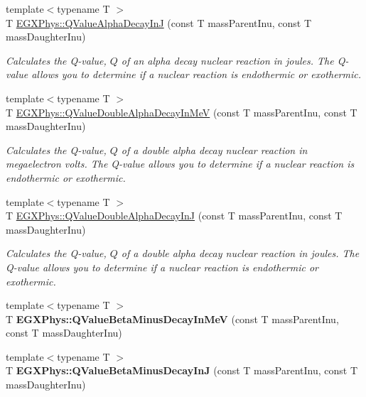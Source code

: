 \begin{DoxyCompactItemize}
{\footnotesize template$<$typename T $>$ }\\T \mbox{\hyperlink{_q_value_8hpp_ab8a50c18f6de3c1b6ed280c26c3ff3a5}{E\+G\+X\+Phys\+::\+Q\+Value\+Alpha\+Decay\+InJ}} (const T mass\+Parent\+Inu, const T mass\+Daughter\+Inu)
\begin{DoxyCompactList}\small\item\em Calculates the Q-\/value, $Q$ of an alpha decay nuclear reaction in joules. The Q-\/value allows you to determine if a nuclear reaction is endothermic or exothermic. \end{DoxyCompactList}\item 
{\footnotesize template$<$typename T $>$ }\\T \mbox{\hyperlink{_q_value_8hpp_a85230c793adc7fc78fef760874f75ad9}{E\+G\+X\+Phys\+::\+Q\+Value\+Double\+Alpha\+Decay\+In\+MeV}} (const T mass\+Parent\+Inu, const T mass\+Daughter\+Inu)
\begin{DoxyCompactList}\small\item\em Calculates the Q-\/value, $Q$ of a double alpha decay nuclear reaction in megaelectron volts. The Q-\/value allows you to determine if a nuclear reaction is endothermic or exothermic. \end{DoxyCompactList}\item 
{\footnotesize template$<$typename T $>$ }\\T \mbox{\hyperlink{_q_value_8hpp_a015ade04346d0c6dae4dda8e3aab8cbd}{E\+G\+X\+Phys\+::\+Q\+Value\+Double\+Alpha\+Decay\+InJ}} (const T mass\+Parent\+Inu, const T mass\+Daughter\+Inu)
\begin{DoxyCompactList}\small\item\em Calculates the Q-\/value, $Q$ of a double alpha decay nuclear reaction in joules. The Q-\/value allows you to determine if a nuclear reaction is endothermic or exothermic. \end{DoxyCompactList}\item 
\mbox{\label{_q_value_8hpp_aac1374ce9ba39bef416f34298708bda9}} 
{\footnotesize template$<$typename T $>$ }\\T {\bfseries E\+G\+X\+Phys\+::\+Q\+Value\+Beta\+Minus\+Decay\+In\+MeV} (const T mass\+Parent\+Inu, const T mass\+Daughter\+Inu)
\item 
\mbox{\label{_q_value_8hpp_ae9a4a9f4c6e0f555e20c3144dd7329fc}} 
{\footnotesize template$<$typename T $>$ }\\T {\bfseries E\+G\+X\+Phys\+::\+Q\+Value\+Beta\+Minus\+Decay\+InJ} (const T mass\+Parent\+Inu, const T mass\+Daughter\+Inu)

\end{DoxyCompactItemize}
